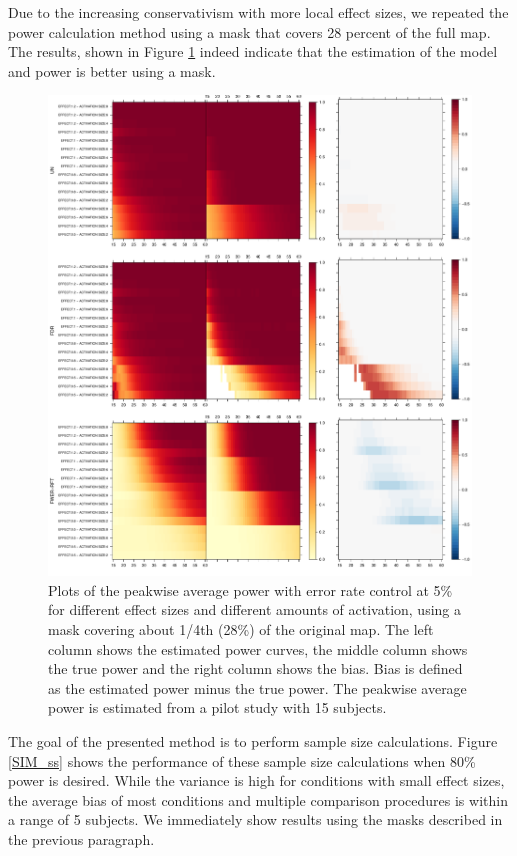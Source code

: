 Due to the increasing conservativism with more local effect sizes, we repeated the power calculation method using a mask that covers 28 percent of the full map.  The results, shown in Figure \ref{SIM_pow_mask} indeed indicate that the estimation of the model and power is better using a mask.

\begin{center}
\begin{figure}[h]
\includegraphics[scale=0.4]{figures/FIG_SIM_power_15_MASK_2_5.pdf}
\caption{Plots of the peakwise average power with error rate control at 5\% for different effect sizes and different amounts of activation, using a mask covering about 1/4th (28\%) of the original map.  The left column shows the estimated power curves, the middle column shows the true power and the right column shows the bias.  Bias is defined as the estimated power minus the true power.  The peakwise average power is estimated from a pilot study with 15 subjects. \label{SIM_pow_mask}}
\end{figure}
\end{center}

The goal of the presented method is to perform sample size calculations.  Figure \ref{SIM_ss} shows the performance of these sample size calculations when 80\% power is desired.  While the variance is high for conditions with small effect sizes, the average bias of most conditions and multiple comparison procedures is within a range of 5 subjects.  We immediately show results using the masks described in the previous paragraph.


